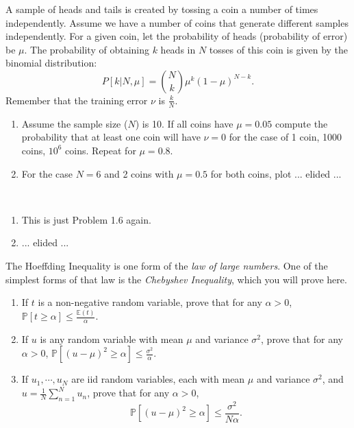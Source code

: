 \documentclass{amsart}
\begin{document}
\begin{problem}[1.7]
  A sample of heads and tails is created by tossing a coin a number of times
  independently. Assume we have a number of coins that generate different
  samples independently. For a given coin, let the probability of heads
  (probability of error) be \(\mu\). The probability of obtaining \(k\) heads
  in \(N\) tosses of this coin is given by the binomial distribution:
  \begin{equation*}
    P\left[k | N, \mu\right] = \binom{N}{k} \mu^k (1-\mu)^{N-k}.
  \end{equation*}
  Remember that the training error \(\nu\) is \(\frac{k}{N}\).
  \begin{enumerate}
    \item Assume the sample size (\(N\)) is 10. If all coins have \(\mu = 0.05\)
      compute the probability that at least one coin will have \(\nu = 0\) for
      the case of 1 coin, 1000 coins, \(10^6\) coins. Repeat for \(\mu = 0.8\).
    \item For the case \(N = 6\) and 2 coins with \(\mu = 0.5\) for both coins,
      plot ... elided ...
  \end{enumerate}
\end{problem}

\begin{solution}\ 
  \begin{enumerate}
    \item This is just Problem 1.6 again.
    \item ... elided ...
  \end{enumerate}
\end{solution}

\begin{problem}[1.8]
  The Hoeffding Inequality is one form of the \emph{law of large numbers}. One
  of the simplest forms of that law is the \emph{Chebyshev Inequality}, which
  you will prove here.
  \begin{enumerate}
    \item If \(t\) is a non-negative random variable, prove that for any
      \(\alpha > 0\), \(\mathbb{P}\left[t \geq \alpha\right] \leq
      \frac{\mathbb{E}(t)}{\alpha}\).
    \item If \(u\) is any random variable with mean \(\mu\) and variance
      \(\sigma^2\), prove that for any \(\alpha > 0\),
      \(\mathbb{P}\left[(u - \mu)^2 \geq \alpha\right] \leq
      \frac{\sigma^2}{\alpha}\).
    \item If \(u_1, \cdots, u_N\) are iid random variables, each with mean
      \(\mu\) and variance \(\sigma^2\), and \(u = \frac{1}{N}\sum_{n=1}^Nu_n\),
      prove that for any \(\alpha > 0\),
      \begin{equation*}
        \mathbb{P}\left[(u - \mu)^2 \geq \alpha\right] \leq
        \frac{\sigma^2}{N\alpha}.
      \end{equation*}
  \end{enumerate}
\end{problem}
\end{document}
